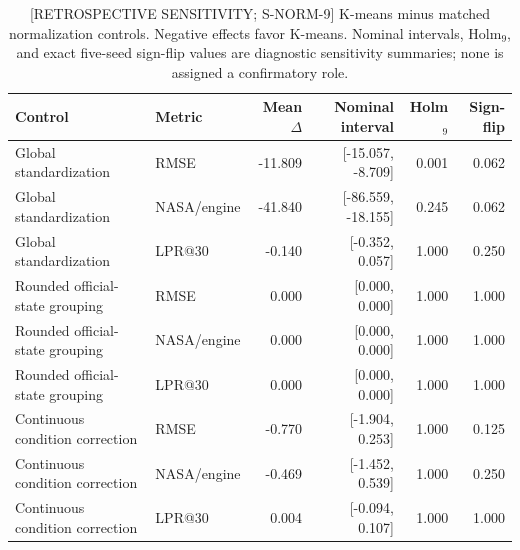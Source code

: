 \begin{table}[!t]
\centering
\scriptsize
\caption{[RETROSPECTIVE SENSITIVITY; S-NORM-9] K-means minus matched normalization controls. Negative effects favor K-means. Nominal intervals, Holm$_9$, and exact five-seed sign-flip values are diagnostic sensitivity summaries; none is assigned a confirmatory role.}
\label{tab:condition-normalization-contrasts}
\begin{tabular}{llrrrr}
\toprule
Control & Metric & Mean $\Delta$ & Nominal interval & Holm$_9$ & Sign-flip \\
\midrule
Global standardization & RMSE & -11.809 & [-15.057, -8.709] & 0.001 & 0.062 \\
Global standardization & NASA/engine & -41.840 & [-86.559, -18.155] & 0.245 & 0.062 \\
Global standardization & LPR@30 & -0.140 & [-0.352, 0.057] & 1.000 & 0.250 \\
Rounded official-state grouping & RMSE & 0.000 & [0.000, 0.000] & 1.000 & 1.000 \\
Rounded official-state grouping & NASA/engine & 0.000 & [0.000, 0.000] & 1.000 & 1.000 \\
Rounded official-state grouping & LPR@30 & 0.000 & [0.000, 0.000] & 1.000 & 1.000 \\
Continuous condition correction & RMSE & -0.770 & [-1.904, 0.253] & 1.000 & 0.125 \\
Continuous condition correction & NASA/engine & -0.469 & [-1.452, 0.539] & 1.000 & 0.250 \\
Continuous condition correction & LPR@30 & 0.004 & [-0.094, 0.107] & 1.000 & 1.000 \\
\bottomrule
\end{tabular}
\end{table}
